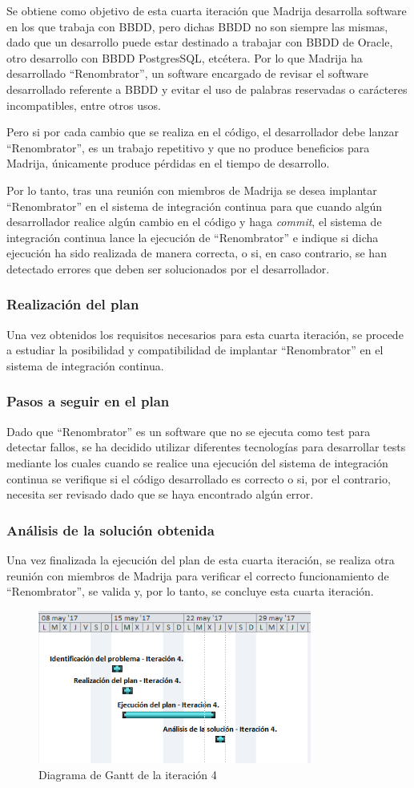 Se obtiene como objetivo de esta cuarta iteración que \ac{Madrija} desarrolla software en los que trabaja con \ac{BBDD}, pero dichas \ac{BBDD} no son siempre las mismas, dado que un desarrollo puede estar destinado a trabajar con \ac{BBDD} de Oracle, otro desarrollo con \ac{BBDD} PostgresSQL, etcétera. Por lo que \ac{Madrija} ha desarrollado ``Renombrator'', un software encargado de revisar el software desarrollado referente a \ac{BBDD} y evitar el uso de palabras reservadas o carácteres incompatibles, entre otros usos.

Pero si por cada cambio que se realiza en el código, el desarrollador debe lanzar ``Renombrator'', es un trabajo repetitivo y que no produce beneficios para \ac{Madrija}, únicamente produce pérdidas en el tiempo de desarrollo.

Por lo tanto, tras una reunión con miembros de \ac{Madrija} se desea implantar ``Renombrator'' en el sistema de integración continua para que cuando algún desarrollador realice algún cambio en el código y haga \textit{commit}, el sistema de integración continua lance la ejecución de ``Renombrator'' e indique si dicha ejecución ha sido realizada de manera correcta, o si, en caso contrario, se han detectado errores que deben ser solucionados por el desarrollador.

\subsubsection{Realización del plan}
Una vez obtenidos los requisitos necesarios para esta cuarta iteración, se procede a estudiar la posibilidad y compatibilidad de implantar ``Renombrator'' en el sistema de integración continua.

\clearpage

\subsubsection{Pasos a seguir en el plan}
Dado que ``Renombrator'' es un software que no se ejecuta como test para detectar fallos, se ha decidido utilizar diferentes tecnologías para desarrollar tests mediante los cuales cuando se realice una ejecución del sistema de integración continua se verifique si el código desarrollado es correcto o si, por el contrario, necesita ser revisado dado que se haya encontrado algún error.

\subsubsection{Análisis de la solución obtenida}
Una vez finalizada la ejecución del plan de esta cuarta iteración, se realiza otra reunión con miembros de \ac{Madrija} para verificar el correcto funcionamiento de ``Renombrator'', se valida y, por lo tanto, se concluye esta cuarta iteración.

\begin{figure}[!h]
\centering
   \includegraphics[width=9cm]{Diag-Gantt_It4.PNG}
\caption{Diagrama de Gantt de la iteración 4}
\end{figure}
